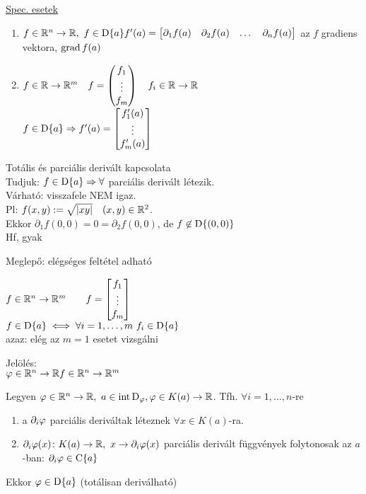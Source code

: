 \begin{Megj}
\item \underline{Spec. esetek}\\
\begin{enumerate}
  \item $f\in\mathbb{R}^n\to\mathbb{R},\ f\in\operatorname{D}\{a\}\\ f'(a) = \begin{bmatrix}\partial_1 f(a) & \partial_2 f(a) & \dots & \partial_n
    f(a)\end{bmatrix}$
    az $f$ gradiens vektora, $\operatorname{grad} f(a)$
  \item $f\in\mathbb{R}\to\mathbb{R}^m\quad f=\begin{pmatrix}f_1\\\vdots\\f_m\end{pmatrix}\quad f_i\in\mathbb{R}\to\mathbb{R}$\\
    $f\in\operatorname{D}\{a\}\Rightarrow f'(a) = \begin{bmatrix}f_1'(a)\\\vdots\\f_m'(a)\end{bmatrix}$
\end{enumerate}
\item Totális és parciális derivált kapcsolata\\
  Tudjuk: $f\in\operatorname{D}\{a\} \Rightarrow \forall $ parciális derivált létezik.\\
  Várható: visszafele NEM igaz.\\
  Pl: $f(x,y) := \sqrt{|xy|}\quad(x,y)\in\mathbb{R}^2$.\\
  Ekkor $\partial_1 f(0,0) = 0 = \partial_2 f(0,0)$, de $f\not\in\operatorname{D}\{(0,0)\}$\\
  Hf, gyak
\item Meglepő: elégséges feltétel adható
\item $f\in\mathbb{R}^n\to\mathbb{R}^m\qquad f=\begin{bmatrix}f_1\\\vdots\\f_m\end{bmatrix}$\\
  $f\in\der a \ekviv \forall i=1,\dotsc,m\ f_i\in\der a$\\
  azaz: elég az $m=1$ esetet vizsgálni  
\item Jelölés:\\
  $\varphi\in\mathbb{R}^n\to\mathbb{R}\\
  f\in\mathbb{R}^n\to\mathbb{R}^m$
\end{Megj}

\begin{te}
  Legyen $\varphi\in\RnR,\ a\in\intD_\varphi,\\\varphi\in K(a)\n\R$.
  Tfh. $\forall i=1,\dotsc,n$-re
  \begin{enumerate}
    \item a $\partial_i\varphi$ parciális deriváltak léteznek $\forall x\in K(a)$-ra.
    \item $\partial_i\vfi(x)\colon K(a)\n\R,\ x\n\partial_i \vfi(x)$ parciális derivált függvények folytonosak az
    $a$-ban: $\partial_i \varphi\in\operatorname{C}\{a\}$      
  \end{enumerate}
Ekkor  $\varphi\in\operatorname{D}\{a\}$ (totálisan deriválható)
\end{te}

